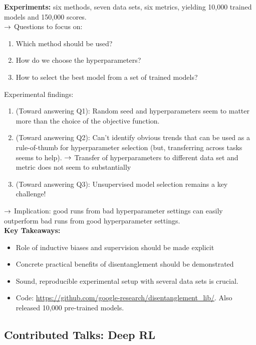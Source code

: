 {\bf Experiments:} six methods, seven data sets, six metrics, yielding 10,000 trained models and 150,000 scores. \\

$\rightarrow$ Questions to focus on:
\begin{enumerate}[Q1]
    \item Which method should be used?
    \item How do we choose the hyperparameters?
    \item How to select the best model from a set of trained models?
\end{enumerate}

Experimental findings:
\begin{enumerate}
    \item (Toward answering Q1): Random seed and hyperparameters seem to matter more than the choice of the objective function.
    \item (Toward answering Q2): Can't identify obvious trends that can be used as a rule-of-thumb for hyperparameter selection (but, transferring across tasks seems to help).
    $\rightarrow$ Transfer of hyperparameters to different data set and metric does not seem to substantially
    \item (Toward answering Q3):  Unsupervised model selection remains a key challenge!
\end{enumerate}

$\rightarrow$ Implication: good runs from bad hyperparameter settings can easily outperform bad runs from good hyperparameter settings. \\

{\bf Key Takeaways:}
\begin{itemize}
    \item Role of inductive biases and supervision should be made explicit
    \item Concrete practical benefits of disentanglement should be demonstrated
    \item Sound, reproducible experimental setup with several data sets is crucial.
    \item Code: \url{https://github.com/google-research/disentanglement_lib/}. Also released 10,000 pre-trained models.
\end{itemize}


\spacerule


\subsection{Contributed Talks: Deep RL}

